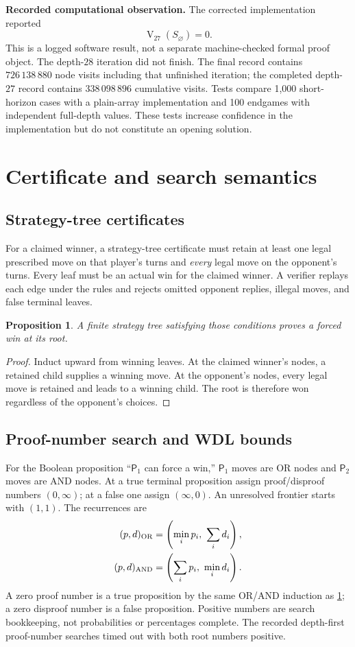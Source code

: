 \documentclass[11pt]{article}
\newtheorem{proposition}[theorem]{Proposition}
\theoremstyle{definition}
\theoremstyle{remark}
\newcommand{\Pone}{\mathsf{P}_1}
\newcommand{\Ptwo}{\mathsf{P}_2}
\newcommand{\Val}{\operatorname{V}}
\begin{document}
\textbf{Recorded computational observation.} The corrected implementation
reported
\[
 \Val_{27}(S_\varnothing)=0.
\]
This is a logged software result, not a separate machine-checked formal
proof object. The depth-$28$ iteration did not finish. The final record
contains $726\,138\,880$ node visits including that unfinished iteration;
the completed depth-$27$ record contains $338\,098\,896$ cumulative visits.
Tests compare 1,000 short-horizon cases with a plain-array implementation
and 100 endgames with independent full-depth values. These tests increase
confidence in the implementation but do not constitute an opening solution.

\section{Certificate and search semantics}\label{sec:semantics}
\subsection{Strategy-tree certificates}
For a claimed winner, a strategy-tree certificate must retain at least one
legal prescribed move on that player's turns and \emph{every} legal move
on the opponent's turns. Every leaf must be an actual win for the claimed
winner. A verifier replays each edge under the rules and rejects omitted
opponent replies, illegal moves, and false terminal leaves.

\begin{proposition}\label{prop:tree}
A finite strategy tree satisfying those conditions proves a forced win
at its root.
\end{proposition}
\begin{proof}
Induct upward from winning leaves. At the claimed winner's nodes, a
retained child supplies a winning move. At the opponent's nodes, every
legal move is retained and leads to a winning child. The root is therefore
won regardless of the opponent's choices.
\end{proof}

\subsection{Proof-number search and WDL bounds}
For the Boolean proposition ``$\Pone$ can force a win,'' $\Pone$ moves are
OR nodes and $\Ptwo$ moves are AND nodes. At a true terminal proposition
assign proof/disproof numbers $(0,\infty)$; at a false one assign
$(\infty,0)$. An unresolved frontier starts with $(1,1)$. The recurrences
are
\begin{align*}
 (p,d)_{\rm OR}&=\left(\min_i p_i,\ \sum_i d_i\right),\\
 (p,d)_{\rm AND}&=\left(\sum_i p_i,\ \min_i d_i\right).
\end{align*}
A zero proof number is a true proposition by the same OR/AND induction
as \cref{prop:tree}; a zero disproof number is a false proposition.
Positive numbers are search bookkeeping, not probabilities or percentages
complete. The recorded depth-first proof-number searches timed out with
both root numbers positive.
\end{document}
